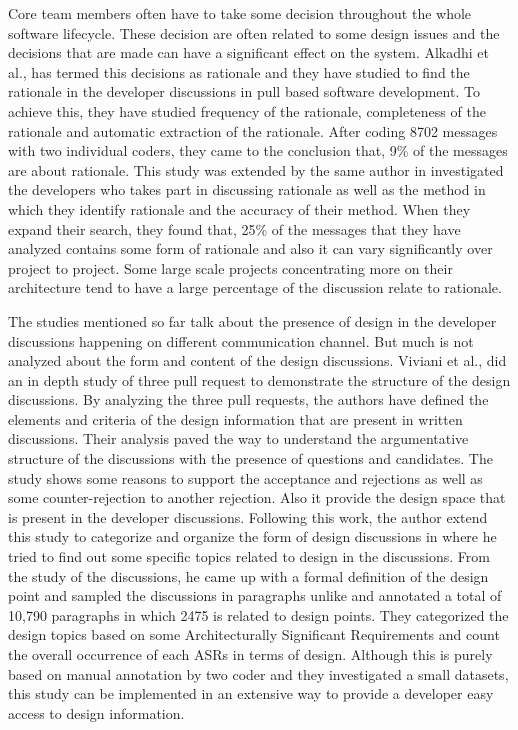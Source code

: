 Core team members often have to take some decision throughout the whole software lifecycle. These decision are often related to some design issues and the decisions that are made can have a significant effect on the system. Alkadhi et al.,\cite{Alkadhi2017} has termed this decisions as rationale and they have studied to find the rationale in the developer discussions in pull based software development. To achieve this, they have studied frequency of the rationale, completeness of the rationale and automatic extraction of the rationale. After coding 8702 messages with two individual coders, they came to the conclusion that, 9\% of the messages are about rationale. This study was extended by the same author in \cite{Alkadhi2018} investigated the developers who takes part in discussing rationale as well as the method in which they identify rationale and the accuracy of their method. When they expand their search, they found that, 25\% of the messages that they have analyzed contains some form of rationale and also it can vary significantly over project to project. Some large scale projects concentrating more on their architecture tend to have a large percentage of the discussion relate to rationale.

The studies mentioned so far talk about the presence of design in the developer discussions happening on different communication channel. But much is not analyzed about the form and content of the design discussions. Viviani et al.,\cite{Viviani2018a} did an in depth study of three pull request to demonstrate the structure of the design discussions. By analyzing the three pull requests, the authors have defined the elements and criteria of the design information that are present in written discussions. Their analysis paved the way to understand the argumentative structure of the discussions with the presence of questions and candidates. The study shows some reasons to support the acceptance and rejections as well as some counter-rejection to another rejection. Also it provide the design space that is present in the developer discussions. Following this work, the author extend this study to categorize and organize the form of design discussions in \cite{Viviani2018} where he tried to find out some specific topics related to design in the discussions. From the study of the discussions, he came up with a formal definition of the design point and sampled the discussions in paragraphs unlike \cite{Brunet2014a} and annotated a total of 10,790 paragraphs in which 2475 is related to design points. They categorized the design topics based on some Architecturally Significant Requirements and count the overall occurrence of each ASRs in terms of design. Although this is purely based on manual annotation by two coder and they investigated a small datasets, this study can be implemented in an extensive way to provide a developer easy access to design information.   

 

